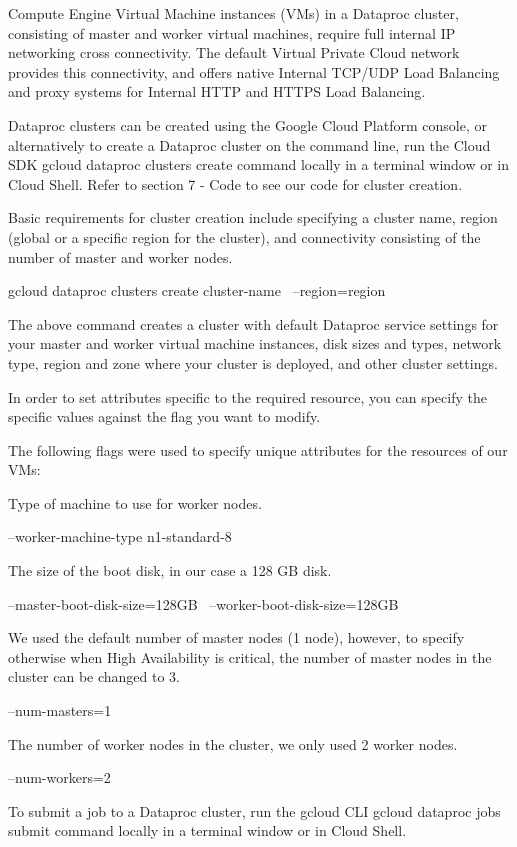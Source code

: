 \documentclass[a4paper,12pt]{article}
\begin{document}
Compute Engine Virtual Machine instances (VMs) in a Dataproc cluster, consisting of master and worker
virtual machines, require full internal IP networking cross connectivity. The default Virtual Private Cloud network provides
this connectivity, and offers native Internal TCP/UDP Load Balancing and proxy systems for Internal
HTTP and HTTPS Load Balancing.

Dataproc clusters can be created using the Google Cloud Platform console, or alternatively to create a Dataproc cluster
on the command line, run the Cloud SDK gcloud dataproc clusters create command locally in a terminal window or in
Cloud Shell. Refer to section 7 - Code to see our code for cluster creation.

Basic requirements for cluster creation include specifying a cluster name, region (global or a specific region for the cluster), and
connectivity consisting of the number of master and worker nodes.

gcloud dataproc clusters create cluster-name \
--region=region

The above command creates a cluster with default Dataproc service settings for your master and worker virtual machine
instances, disk sizes and types, network type, region and zone where your cluster is deployed, and other cluster settings.

In order to set attributes specific to the required resource, you can specify the specific values against the
flag you want to modify.

The following flags were used to specify unique attributes for the resources of our VMs:

Type of machine to use for worker nodes.

--worker-machine-type n1-standard-8 \

The size of the boot disk, in our case a 128 GB disk.

--master-boot-disk-size=128GB \
--worker-boot-disk-size=128GB \

We used the default number of master nodes (1 node), however, to specify otherwise when High Availability is critical,
the number of master nodes in the cluster can be changed to 3.

--num-masters=1

The number of worker nodes in the cluster, we only used 2 worker nodes.

--num-workers=2 \

To submit a job to a Dataproc cluster, run the gcloud CLI gcloud dataproc jobs submit command locally
in a terminal window or in Cloud Shell.
\end{document}
